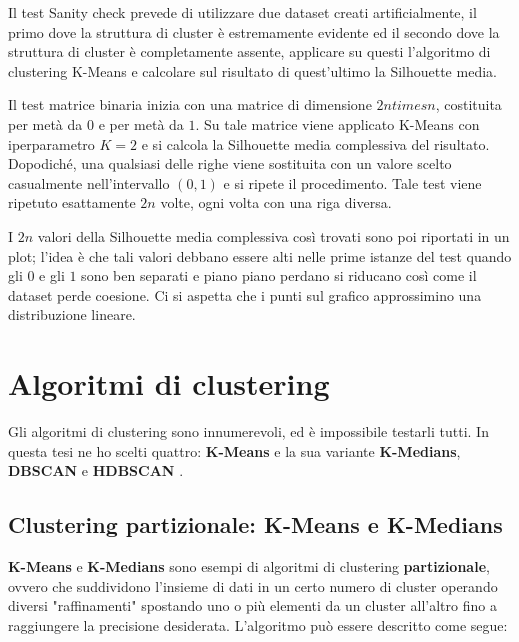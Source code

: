 \documentclass[a4paper, 12pt]{report}
\begin{document}
			Il test Sanity check prevede di utilizzare due dataset creati
			artificialmente, il primo dove la struttura di cluster è
			estremamente evidente ed il secondo dove la struttura di
			cluster è completamente assente, applicare su questi l'algoritmo
			di clustering K-Means e calcolare sul risultato di quest'ultimo
			la Silhouette media.

			Il test matrice binaria inizia con una matrice di dimensione
			$2n times n$, costituita per metà da $0$ e per metà da $1$.
			Su tale matrice viene applicato K-Means con iperparametro
			$K = 2$ e si calcola la Silhouette media complessiva del
			risultato. Dopodiché, una qualsiasi delle righe viene sostituita
			con un valore scelto casualmente nell'intervallo $(0, 1)$ e si
			ripete il procedimento. Tale test viene ripetuto esattamente
			$2n$ volte, ogni volta con una riga diversa.

			I $2n$ valori della Silhouette media complessiva così trovati
			sono poi riportati in un plot; l'idea è che tali valori debbano
			essere alti nelle prime istanze del test quando gli $0$ e gli
			$1$ sono ben separati e piano piano perdano si riducano così
			come il dataset perde coesione. Ci si aspetta che i punti sul
			grafico approssimino una distribuzione lineare.

		\section{Algoritmi di clustering}

			Gli algoritmi di clustering sono innumerevoli, ed è
			impossibile testarli tutti. In questa tesi ne ho scelti
			quattro: \textbf{K-Means} \cite{1056489} e la sua variante
			\textbf{K-Medians}, \textbf{DBSCAN} \cite{10.5555/3001460.3001507}
			e \textbf{HDBSCAN} \cite{10.1007/978-3-642-37456-2_14}.

			\subsection{Clustering partizionale: K-Means e K-Medians}

				\textbf{K-Means} e \textbf{K-Medians} sono esempi di algoritmi
				di clustering \textbf{partizionale}, ovvero che suddividono
				l'insieme di dati in un certo numero di cluster operando diversi
				"raffinamenti" spostando uno o più elementi da un cluster all'altro
				fino a raggiungere la precisione desiderata. L'algoritmo può essere
				descritto come segue:
\end{document}
